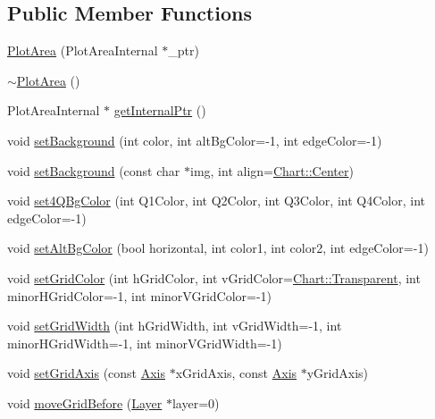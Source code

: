 \subsection*{Public Member Functions}
\begin{DoxyCompactItemize}
\item 
\hyperlink{class_plot_area_a4b38b54794b596846e0659be8f729392}{Plot\+Area} (Plot\+Area\+Internal $\ast$\+\_\+ptr)
\item 
\hyperlink{class_plot_area_ae91f833061c93637f8c90b1f2a380400}{$\sim$\+Plot\+Area} ()
\item 
Plot\+Area\+Internal $\ast$ \hyperlink{class_plot_area_affa85a783dca97e6e63717697f395f96}{get\+Internal\+Ptr} ()
\item 
void \hyperlink{class_plot_area_a04f56242f125bf96a1c6e8dc0ce74342}{set\+Background} (int color, int alt\+Bg\+Color=-\/1, int edge\+Color=-\/1)
\item 
void \hyperlink{class_plot_area_abcd924d1be7c5a3f4267f2cbbf14deaa}{set\+Background} (const char $\ast$img, int align=\hyperlink{namespace_chart_ae222e51ce11a254450b6ddfbc862680aab21c196681da027efd151236305b985d}{Chart\+::\+Center})
\item 
void \hyperlink{class_plot_area_a63d453fecea4dd5f9cfdabf43602d3f8}{set4\+Q\+Bg\+Color} (int Q1\+Color, int Q2\+Color, int Q3\+Color, int Q4\+Color, int edge\+Color=-\/1)
\item 
void \hyperlink{class_plot_area_ad38abf9c2e982fbf8a19f32204d19b67}{set\+Alt\+Bg\+Color} (bool horizontal, int color1, int color2, int edge\+Color=-\/1)
\item 
void \hyperlink{class_plot_area_a5f02a40eeaf5fbde3332d5c6188f4556}{set\+Grid\+Color} (int h\+Grid\+Color, int v\+Grid\+Color=\hyperlink{namespace_chart_abee0d882fdc9ad0b001245ad9fc64011afc6811800a9e2582dac0157b6279f836}{Chart\+::\+Transparent}, int minor\+H\+Grid\+Color=-\/1, int minor\+V\+Grid\+Color=-\/1)
\item 
void \hyperlink{class_plot_area_a12308305634a1a5026d0e80811af7645}{set\+Grid\+Width} (int h\+Grid\+Width, int v\+Grid\+Width=-\/1, int minor\+H\+Grid\+Width=-\/1, int minor\+V\+Grid\+Width=-\/1)
\item 
void \hyperlink{class_plot_area_a4331047ed4ae116093d50c0a69e6bd91}{set\+Grid\+Axis} (const \hyperlink{class_axis}{Axis} $\ast$x\+Grid\+Axis, const \hyperlink{class_axis}{Axis} $\ast$y\+Grid\+Axis)
\item 
void \hyperlink{class_plot_area_ac00dbf72a76b6c88f3edbe1f74c21550}{move\+Grid\+Before} (\hyperlink{class_layer}{Layer} $\ast$layer=0)

\end{DoxyCompactItemize}
